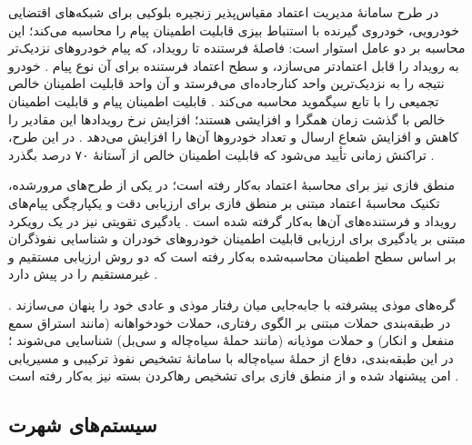 \documentclass[12pt,a4paper]{article}
\begin{document}
در طرح سامانهٔ مدیریت اعتماد مقیاس‌پذیر زنجیره بلوکیی برای شبکه‌های اقتضایی خودرویی، خودروی گیرنده با استنباط بیزی قابلیت اطمینان پیام را محاسبه می‌کند؛ این محاسبه بر دو عامل استوار است: فاصلهٔ فرستنده تا رویداد، که پیام خودرو‌های نزدیک‌تر به رویداد را قابل اعتمادتر می‌سازد، و سطح اعتماد فرستنده برای آن نوع پیام \cite{ghovanlooyghajarSBTMSScalableBlockchain2021}. خودرو نتیجه را به نزدیک‌ترین واحد کنارجاده‌ای می‌فرستد و آن واحد قابلیت اطمینان خالص تجمیعی را با تابع سیگموید محاسبه می‌کند \cite{ghovanlooyghajarSBTMSScalableBlockchain2021}. قابلیت اطمینان پیام و قابلیت اطمینان خالص با گذشت زمان همگرا و افزایشی هستند؛ افزایش نرخ رویداد‌ها این مقادیر را کاهش و افزایش شعاع ارسال و تعداد خودرو‌ها آن‌ها را افزایش می‌دهد \cite{ghovanlooyghajarSBTMSScalableBlockchain2021}. در این طرح، تراکنش زمانی تأیید می‌شود که قابلیت اطمینان خالص از آستانهٔ ۷۰ درصد بگذرد \cite{ghovanlooyghajarSBTMSScalableBlockchain2021}.

منطق فازی نیز برای محاسبهٔ اعتماد به‌کار رفته است؛ در یکی از طرح‌های مرورشده، تکنیک محاسبهٔ اعتماد مبتنی بر منطق فازی برای ارزیابی دقت و یکپارچگی پیام‌های رویداد و فرستنده‌های آن‌ها به‌کار گرفته شده است \cite{farsimadanReviewSecurityChallenges2025}. یادگیری تقویتی نیز در یک رویکرد مبتنی بر یادگیری  برای ارزیابی قابلیت اطمینان خودرو‌های خودران و شناسایی نفوذگران بر اساس سطح اطمینان محاسبه‌شده به‌کار رفته است که دو روش ارزیابی مستقیم و غیرمستقیم را در پیش دارد \cite{farsimadanReviewSecurityChallenges2025}.

گره‌های موذی پیشرفته با جابه‌جایی میان رفتار موذی و عادی خود را پنهان می‌سازند \cite{farsimadanReviewSecurityChallenges2025}. در طبقه‌بندی حملات مبتنی بر الگوی رفتاری، حملات خودخواهانه (مانند استراق سمع منفعل و انکار) و حملات موذیانه (مانند حملهٔ سیاه‌چاله و سی‌بل) شناسایی می‌شوند \cite{farsimadanReviewSecurityChallenges2025}؛ در این طبقه‌بندی، دفاع از حملهٔ سیاه‌چاله با سامانهٔ تشخیص نفوذ ترکیبی و مسیریابی امن پیشنهاد شده و از منطق فازی برای تشخیص رهاکردن بسته نیز به‌کار رفته است \cite{farsimadanReviewSecurityChallenges2025}.

\subsection{سیستم‌های شهرت}
\end{document}
